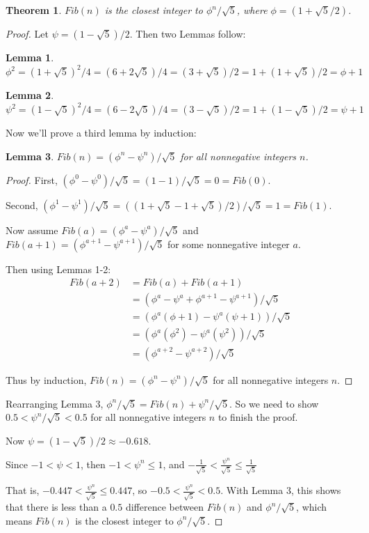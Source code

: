 \documentclass{amsart}
\newtheorem*{thm}{Theorem}
\newtheorem{lem}{Lemma}
\begin{document}
  \begin{thm}
    $Fib(n)$ is the closest integer to $\phi^n/\sqrt{5}$, where $\phi=(1+\sqrt{5}/2)$.
  \end{thm}
  \begin{proof}
    Let $\psi=(1-\sqrt{5})/2$. Then two Lemmas follow:

    \begin{lem}
      $\phi^2=(1+\sqrt{5})^2/4=(6+2\sqrt{5})/4=(3+\sqrt{5})/2=1+(1+\sqrt{5})/2=\phi+1$
    \end{lem}

    \begin{lem}
      $\psi^2=(1-\sqrt{5})^2/4=(6-2\sqrt{5})/4=(3-\sqrt{5})/2=1+(1-\sqrt{5})/2=\psi+1$
    \end{lem}

    Now we'll prove a third lemma by induction:

    \begin{lem}
      $Fib(n)=(\phi^n-\psi^n)/\sqrt{5}$ for all nonnegative integers $n$.
    \end{lem}

    \begin{proof}
      First, $(\phi^0-\psi^0)/\sqrt{5}=(1-1)/\sqrt{5}=0=Fib(0)$.

      Second, $(\phi^1-\psi^1)/\sqrt{5}=((1+\sqrt{5}-1+\sqrt{5})/2)/\sqrt{5}=1=Fib(1)$.

      Now assume $Fib(a)=(\phi^a-\psi^a)/\sqrt{5}$ and $Fib(a+1)=(\phi^{a+1}-\psi^{a+1})/\sqrt{5}$
      for some nonnegative integer $a$.

      Then using Lemmas 1-2:
      \begin{align*}
        Fib(a+2)&=Fib(a)+Fib(a+1)\\
                &=(\phi^a-\psi^a+\phi^{a+1}-\psi^{a+1})/\sqrt{5}\\
                &=(\phi^a(\phi+1)-\psi^a(\psi+1))/\sqrt{5}\\
                &=(\phi^a(\phi^2)-\psi^a(\psi^2))/\sqrt{5}\\
                &=(\phi^{a+2}-\psi^{a+2})/\sqrt{5}
      \end{align*}

      Thus by induction, $Fib(n)=(\phi^n-\psi^n)/\sqrt{5}$ for all nonnegative integers $n$.
    \end{proof}

    Rearranging Lemma 3, $\phi^n/\sqrt{5}=Fib(n)+\psi^n/\sqrt{5}$. So we need to show
    $0.5<\psi^n/\sqrt{5}<0.5$ for all nonnegative integers $n$ to finish the proof.

    Now $\psi=(1-\sqrt{5})/2\approx-0.618$.

    Since $-1<\psi<1$, then $-1<\psi^n\le1$, and 
    $-\frac{1}{\sqrt{5}}<\frac{\psi^n}{\sqrt{5}}\le\frac{1}{\sqrt{5}}$

    That is, $-0.447<\frac{\psi^n}{\sqrt{5}}\le0.447$, so
    $-0.5<\frac{\psi^n}{\sqrt{5}}<0.5$. With Lemma 3, this shows that there is less than
    a $0.5$ difference between $Fib(n)$ and $\phi^n/\sqrt{5}$, which means $Fib(n)$ is the
    closest integer to $\phi^n/\sqrt{5}$.
  \end{proof}
\end{document}
